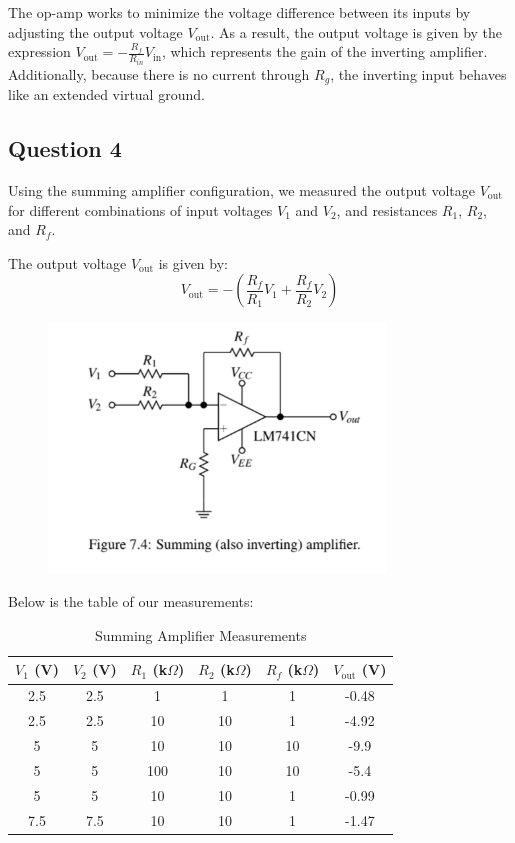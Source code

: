 \documentclass{article}
\begin{document}
The op-amp works to minimize the voltage difference between its inputs by 
adjusting the output voltage \( V_{\text{out}} \). As a result, the output 
voltage is given by the expression \( V_{\text{out}} = -\frac{R_f}{R_{in}} V_{\text{in}} \), 
which represents the gain of the inverting amplifier. Additionally, because there is 
no current through \( R_g \), the inverting input behaves like an extended virtual ground.

\subsection*{Question 4}
Using the summing amplifier configuration, we measured the output voltage \( V_{\text{out}} \) for different combinations of input voltages \( V_1 \) and \( V_2 \), and resistances \( R_1 \), \( R_2 \), and \( R_f \).

The output voltage \( V_{\text{out}} \) is given by:
\[
V_{\text{out}} = -\left(\frac{R_f}{R_1} V_1 + \frac{R_f}{R_2} V_2\right)
\]

\begin{figure}[H]
    \centering
    \includegraphics[width=0.8\textwidth]{img/Lab 7/4_1.png} %
    \caption{}
\end{figure}

Below is the table of our measurements:

\begin{table}[H]
\centering
\caption{Summing Amplifier Measurements}
\begin{tabular}{|c|c|c|c|c|c|}
\hline
\textbf{\( V_1 \) (V)} & \textbf{\( V_2 \) (V)} & \textbf{\( R_1 \) (k\(\Omega\))} & \textbf{\( R_2 \) (k\(\Omega\))} & \textbf{\( R_f \) (k\(\Omega\))} & \textbf{\( V_{\text{out}} \) (V)} \\
\hline
2.5 & 2.5 & 1   & 1   & 1   & -0.48 \\
2.5 & 2.5 & 10  & 10  & 1   & -4.92 \\
5   & 5   & 10  & 10  & 10  & -9.9  \\
5   & 5   & 100 & 10  & 10  & -5.4  \\
5   & 5   & 10  & 10  & 1   & -0.99 \\
7.5 & 7.5 & 10  & 10  & 1   & -1.47 \\
\hline
\end{tabular}
\end{table}
\end{document}
